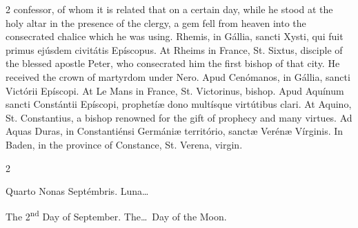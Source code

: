 \begin{paracol}{2}
 confessor, of whom it is related that on a certain day, while he stood at 
 the holy altar in the presence of the clergy, a gem fell from heaven into 
 the consecrated chalice which he was using.
\switchcolumn*
{}
Rhemis, in Gállia, 
 sancti Xysti, qui fuit primus ejúsdem civitátis Epíscopus.
\switchcolumn
{}
At Rheims in France, St. Sixtus, 
 disciple of the blessed apostle Peter, who consecrated him the first bishop 
 of that city. He received the crown of martyrdom under Nero.
\switchcolumn*
{}
Apud Cenómanos, in 
 Gállia, sancti Victórii Epíscopi.
\switchcolumn
{}
At Le Mans in France, St. Victorinus, 
 bishop.
\switchcolumn*
{}
Apud Aquínum sancti 
 Constántii Epíscopi, prophetíæ dono multísque virtútibus clari.
\switchcolumn
{}
At Aquino, St. Constantius, a bishop 
 renowned for the gift of prophecy and many virtues.
\switchcolumn*
{}
Ad Aquas Duras, in 
 Constantiénsi Germániæ território, sanctæ Verénæ Vírginis.
\switchcolumn
{}
In Baden, in the province of 
 Constance, St. Verena, virgin.
\switchcolumn*
{}
\end{paracol}


\begin{paracol}{2}
\begin{center}{\color{gregoriocolor} Quarto Nonas Septémbris. 
 Luna\dots\ }\end{center}
\switchcolumn
{}
\begin{center}{\color{gregoriocolor} The 2\textsuperscript{nd} Day of September. The\dots\ Day 
 of the Moon.}\end{center}
\end{paracol}

